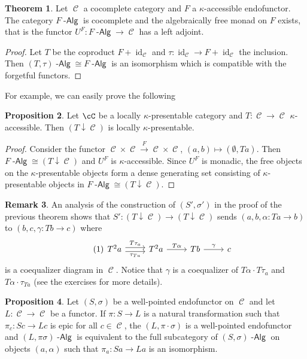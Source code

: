 \documentclass[a4paper,11pt,oneside,openany]{scrbook}
\DeclareMathOperator{\Alg}{-\mathsf{Alg}}
\newcommand{\from}{\colon}
\DeclareMathOperator{\C}{\mathcal{C}}
\DeclareMathOperator{\id}{id}
\theoremstyle{definition}
\newtheorem{thm}{Theorem}[section] %
\theoremstyle{definition}
\newtheorem{prop}[thm]{Proposition}
\newtheorem{rmk}[thm]{Remark}
\begin{document}
\begin{thm}
    Let $ \C $ a cocomplete category and $ F $ a $ \kappa $-accessible endofunctor.
    The category $ F\Alg $ is cocomplete and the algebraically free monad on $ F $ exists, that is the functor
    $ U^F \from F\Alg \to \C $ has a left adjoint.
\end{thm}
\begin{proof}
    Let $ T $ be the coproduct $ F + \id_{\C} $ and $ \tau\from \id_{\C} \to F+\id_{\C} $ the inclusion.
    Then $  (T,\tau)\Alg \cong F\Alg $ is an isomorphism which is compatible with the forgetful functors.
\end{proof}
For example, we can easily prove the following
\begin{prop}
    Let $ \cC $ be a locally $ \kappa $-presentable category and $ T \from \C
    \to \C $ $ \kappa $-accessible. Then $ (T\downarrow\C) $ is locally $ \kappa
    $-presentable.
\end{prop}
\begin{proof}
    Consider the functor $ \C \times \C \xrightarrow{F} \C \times \C $, $ (a,b)\mapsto (\emptyset, Ta) $.
    Then $ F\Alg \cong (T\downarrow\C) $ and $ U^F $ is $ \kappa $-accessible.
    Since $ U^F  $ is monadic, the free objects on the $ \kappa $-presentable objects form a dense generating set consisting of $ \kappa $-presentable objects in $ F\Alg \cong (T\downarrow\C) $.
\end{proof}
\begin{rmk}
    An analysis of the construction of $ (S',\sigma') $ in the proof of the previous theorem shows that $ S' \from (T\downarrow\C) \to (T\downarrow\C) $ sends $ (a,b,\alpha \from Ta \to b) $ to $ (b,c, \gamma \from Tb \to c) $ where
    \begin{displaymath}\tag{1}\label{fork1}
        \begin{tikzcd}
	    T^2 a \arrow[r,shift left, "T \tau_a"]\arrow[r,shift right, "\tau_{Ta}"']& T^2 a \arrow[r, "T\alpha" ] & Tb \arrow[r, "\gamma"]  & c
        \end{tikzcd}
    \end{displaymath}
    is a coequalizer diagram in $ \C $.
    Notice that $ \gamma $ is a coequalizer of $ T\alpha \cdot T\tau_a $ and $
    T\alpha \cdot \tau_{Ta} $ (see the exercises for more details).
\end{rmk}
\begin{prop}
    Let $ (S,\sigma) $ be a well-pointed endofunctor on $ \C $ and let $ L\from \C \to \C $ be a functor.
    If $ \pi \from S \to L $ is a natural transformation such that $ \pi_c \from
    Sc \to Lc $ is epic for all $ c\in\C $, the $ (L,\pi\cdot \sigma) $ is a well-pointed endofunctor and $ (L,\pi\sigma)\Alg $ is equivalent to the full subcategory of $ (S,\sigma)\Alg $ on objects $ (a,\alpha) $ such that $ \pi_a\colon Sa \to La $ is an isomorphism.
\end{prop}
\end{document}
